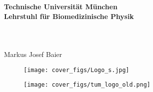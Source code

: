 \renewcommand{\baselinestretch}{1.3}

\thispagestyle{empty}
\begin{center}
  {\large \bf Technische Universit\"at M\"unchen}
  \\[.3cm]
  {\large \bf Lehrstuhl für Biomedizinische Physik}
  \\[2cm]


  {\huge \bf } 
  \\ [.3cm]
  {\huge \bf }
  \\ [.3cm]
  {\huge \bf } \\[2cm]


  {\Large  Markus Josef Baier} %
  \vfill



\begin{figure}[h] %
\begin{center}
  \texttt{[image: cover\_figs/Logo\_s.jpg]}
\end{center}
\end{figure}




\begin{figure}[h] %
\begin{center}
  \texttt{[image: cover\_figs/tum\_logo\_old.png]}
\end{center}
\end{figure}





\end{center}
%



\renewcommand{\baselinestretch}{}



